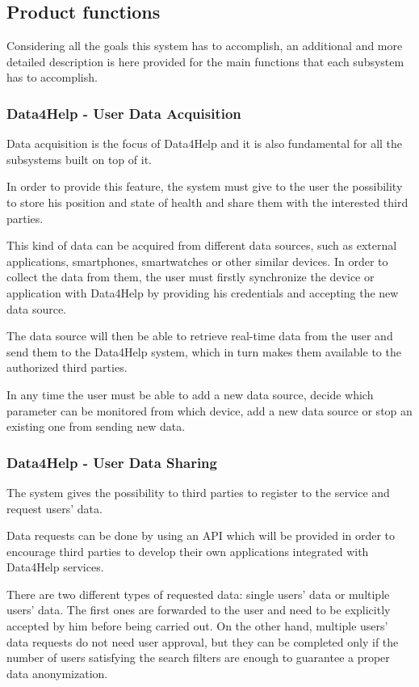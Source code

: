 \newpage
	
\subsection{Product functions}
Considering all the goals this system has to accomplish, an additional and more detailed description is here provided for the main functions that each subsystem has to accomplish.

\subsubsection{Data4Help - User Data Acquisition}
Data acquisition is the focus of Data4Help and it is also fundamental for all the subsystems built on top of it.

In order to provide this feature, the system must give to the user the possibility to store his position and state of health and share them with the interested third parties.
 
This kind of data can be acquired from different data sources, such as external applications, smartphones, smartwatches or other similar devices. In order to collect the data from them, the user must firstly synchronize the device or application with Data4Help by providing his credentials and accepting the new data source.

The data source will then be able to retrieve real-time data from the user and send them to the Data4Help system, which in turn makes them available to the authorized third parties.

In any time the user must be able to add a new data source, decide which parameter can be monitored from which device, add a new data source or stop an existing one from sending new data.

\subsubsection{Data4Help - User Data Sharing}
The system gives the possibility to third parties to register to the service and request users' data.

Data requests can be done by using an API which will be provided in order to encourage third parties to develop their own applications integrated with Data4Help services.

There are two different types of requested data: single users' data or multiple users' data. The first ones are forwarded to the user and need to be explicitly accepted by him before being carried out. On the other hand, multiple users' data requests do not need user approval, but they can be completed only if the number of users satisfying the search filters are enough to guarantee a proper data anonymization.

